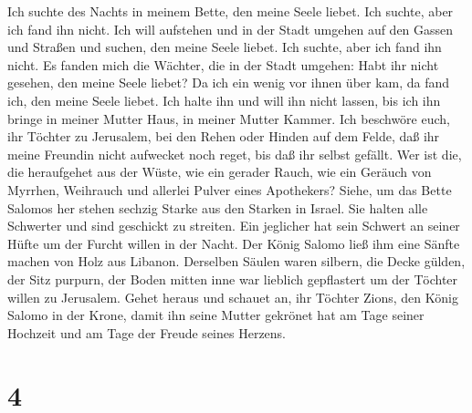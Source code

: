  Ich suchte des Nachts in meinem Bette, den meine Seele
liebet. Ich suchte, aber ich fand ihn nicht.  Ich will
aufstehen und in der Stadt umgehen auf den Gassen und Straßen und
suchen, den meine Seele liebet. Ich suchte, aber ich fand ihn nicht.
 Es fanden mich die Wächter, die in der Stadt umgehen: Habt
ihr nicht gesehen, den meine Seele liebet?  Da ich ein wenig
vor ihnen über kam, da fand ich, den meine Seele liebet. Ich halte ihn
und will ihn nicht lassen, bis ich ihn bringe in meiner Mutter Haus, in
meiner Mutter Kammer.  Ich beschwöre euch, ihr Töchter zu
Jerusalem, bei den Rehen oder Hinden auf dem Felde, daß ihr meine
Freundin nicht aufwecket noch reget, bis daß ihr selbst gefällt.
 Wer ist die, die heraufgehet aus der Wüste, wie ein gerader
Rauch, wie ein Geräuch von Myrrhen, Weihrauch und allerlei Pulver eines
Apothekers?  Siehe, um das Bette Salomos her stehen sechzig
Starke aus den Starken in Israel.  Sie halten alle Schwerter
und sind geschickt zu streiten. Ein jeglicher hat sein Schwert an seiner
Hüfte um der Furcht willen in der Nacht.  Der König Salomo
ließ ihm eine Sänfte machen von Holz aus Libanon. 
Derselben Säulen waren silbern, die Decke gülden, der Sitz purpurn, der
Boden mitten inne war lieblich gepflastert um der Töchter willen zu
Jerusalem.  Gehet heraus und schauet an, ihr Töchter Zions,
den König Salomo in der Krone, damit ihn seine Mutter gekrönet hat am
Tage seiner Hochzeit und am Tage der Freude seines Herzens.

\hypertarget{section-3}{%
\section{4}\label{section-3}}


